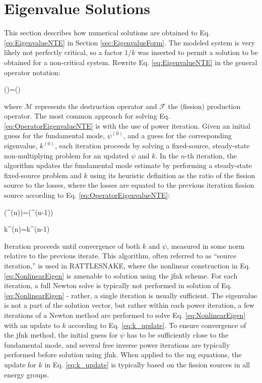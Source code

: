 \section{Eigenvalue Solutions}
\label{sec:EigenvalueCalculations}

This section describes how numerical solutions are obtained to Eq. \eqref{eq:EigenvalueNTE} in Section \ref{sec:EigenvalueForm}. The modeled system is very likely not perfectly critical, so a factor \(1/k\) was inserted to permit a solution to be obtained for a non-critical system. Rewrite Eq. \eqref{eq:EigenvalueNTE} in the general operator notation:

\beq
\label{eq:OperatorEigenvalueNTE}
(\psi)=(\psi)
\eeq

where \(\mathscr{M}\) represents the destruction operator and \(\mathscr{F}\) the (fission) production operator. The most common approach for solving Eq. \eqref{eq:OperatorEigenvalueNTE} is with the use of power iteration. Given an initial guess for the fundamental mode, \(\psi^{(0)}\), and a guess for the corresponding eigenvalue, \(k^{(0)}\), each iteration proceeds by solving a fixed-source, steady-state non-multiplying problem for an updated \(\psi\) and \(k\). In the \(n\)-th iteration, the algorithm updates the fundamental mode estimate by performing a steady-state fixed-source problem and \(k\) using its heuristic definition as the ratio of the fission source to the losses, where the losses are equated to the previous iteration fission source according to Eq. \eqref{eq:OperatorEigenvalueNTE}:

\beq
\label{eq:NonlinearEigen}
\left(\psi^{(n)}\right)=\left(\psi^{(n-1)}\right)
\eeq

\beq
\label{eq:k_update}
k^{(n)}=k^{(n-1)}
\eeq

Iteration proceeds until convergence of both \(k\) and \(\psi\), measured in some norm relative to the previous iterate. This algorithm, often referred to as ``source iteration,'' is used in RATTLESNAKE, where the nonlinear construction in Eq. \eqref{eq:NonlinearEigen} is amenable to solution using the \gls{jfnk} scheme. For each iteration, a full Newton solve is typically not performed in solution of Eq. \eqref{eq:NonlinearEigen} - rather, a single iteration is usually sufficient. The eigenvalue is not a part of the solution vector, but rather within each power iteration, a few iterations of a Newton method are performed to solve Eq. \eqref{eq:NonlinearEigen} with an update to \(k\) according to Eq. \eqref{eq:k_update}. To ensure convergence of the \gls{jfnk} method, the initial guess for \(\psi\) has to be sufficiently close to the fundamental mode, and several free inverse power iterations are typically performed before solution using \gls{jfnk}. When applied to the \gls{mg} equations, the update for \(k\) in Eq. \eqref{eq:k_update} is typically based on the fission sources in all energy groups.

